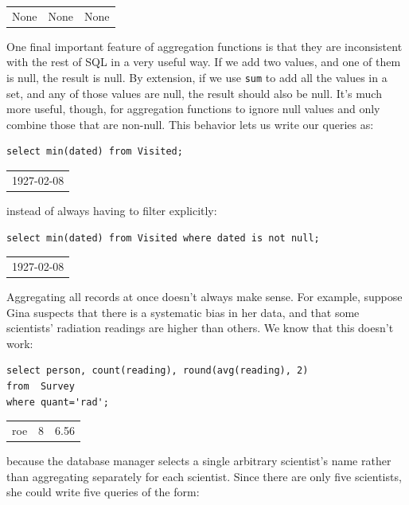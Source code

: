 \documentclass{book}
\begin{document}
\begin{tabular}{lll} %
None & None & None \\
\end{tabular}

One final important feature of aggregation functions is that they are
inconsistent with the rest of SQL in a very useful way. If we add two
values, and one of them is null, the result is null. By extension, if we
use \texttt{sum} to add all the values in a set, and any of those values
are null, the result should also be null. It's much more useful, though,
for aggregation functions to ignore null values and only combine those
that are non-null. This behavior lets us write our queries as:

\begin{verbatim}
select min(dated) from Visited;
\end{verbatim}

\begin{tabular}{l}
1927-02-08 \\
\end{tabular}

instead of always having to filter explicitly:

\begin{verbatim}
select min(dated) from Visited where dated is not null;
\end{verbatim}

\begin{tabular}{l}
1927-02-08 \\
\end{tabular}

Aggregating all records at once doesn't always make sense. For example,
suppose Gina suspects that there is a systematic bias in her data, and
that some scientists' radiation readings are higher than others. We know
that this doesn't work:

\begin{verbatim}
select person, count(reading), round(avg(reading), 2)
from  Survey
where quant='rad';
\end{verbatim}

\begin{tabular}{lll}
roe & 8 & 6.56 \\
\end{tabular}

because the database manager selects a single arbitrary scientist's name
rather than aggregating separately for each scientist. Since there are
only five scientists, she could write five queries of the form:
\end{document}
